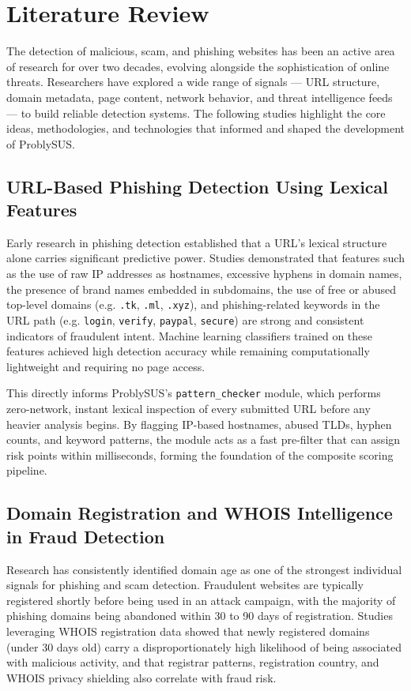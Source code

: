 \chapter{Literature Review}
\label{ch:literature}

The detection of malicious, scam, and phishing websites has been an active area of research for over two decades, evolving alongside the sophistication of online threats. Researchers have explored a wide range of signals — URL structure, domain metadata, page content, network behavior, and threat intelligence feeds — to build reliable detection systems. The following studies highlight the core ideas, methodologies, and technologies that informed and shaped the development of ProblySUS.

\section{URL-Based Phishing Detection Using Lexical Features}

Early research in phishing detection established that a URL's lexical structure alone carries significant predictive power. Studies demonstrated that features such as the use of raw IP addresses as hostnames, excessive hyphens in domain names, the presence of brand names embedded in subdomains, the use of free or abused top-level domains (e.g. \texttt{.tk}, \texttt{.ml}, \texttt{.xyz}), and phishing-related keywords in the URL path (e.g. \texttt{login}, \texttt{verify}, \texttt{paypal}, \texttt{secure}) are strong and consistent indicators of fraudulent intent. Machine learning classifiers trained on these features achieved high detection accuracy while remaining computationally lightweight and requiring no page access.

This directly informs ProblySUS's \texttt{pattern\_checker} module, which performs zero-network, instant lexical inspection of every submitted URL before any heavier analysis begins. By flagging IP-based hostnames, abused TLDs, hyphen counts, and keyword patterns, the module acts as a fast pre-filter that can assign risk points within milliseconds, forming the foundation of the composite scoring pipeline.

\section{Domain Registration and WHOIS Intelligence in Fraud Detection}

Research has consistently identified domain age as one of the strongest individual signals for phishing and scam detection. Fraudulent websites are typically registered shortly before being used in an attack campaign, with the majority of phishing domains being abandoned within 30 to 90 days of registration. Studies leveraging WHOIS registration data showed that newly registered domains (under 30 days old) carry a disproportionately high likelihood of being associated with malicious activity, and that registrar patterns, registration country, and WHOIS privacy shielding also correlate with fraud risk.


